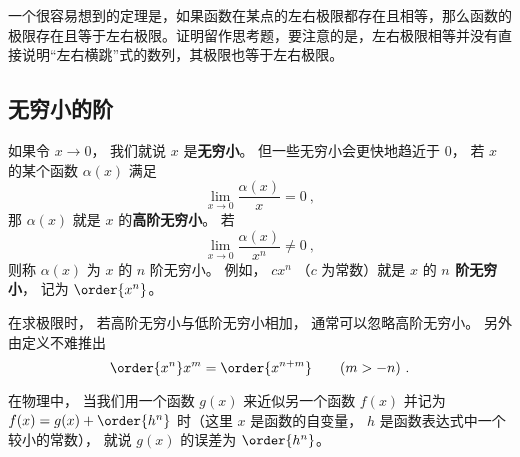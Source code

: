 一个很容易想到的定理是，如果函数在某点的左右极限都存在且相等，那么函数的极限存在且等于左右极限。证明留作思考题，要注意的是，左右极限相等并没有直接说明“左右横跳”式的数列，其极限也等于左右极限。





\subsection{无穷小的阶}\label{sub_Lim_1}
如果令 $x\to 0$， 我们就说 $x$ 是\textbf{无穷小}。 但一些无穷小会更快地趋近于 $0$， 若 $x$ 的某个函数 $\alpha(x)$ 满足
\begin{equation}
\lim_{x\to 0} \frac{\alpha(x)}{x} = 0~,
\end{equation}
那 $\alpha(x)$ 就是 $x$ 的\textbf{高阶无穷小}。 若
\begin{equation}
\lim_{x\to 0} \frac{\alpha(x)}{x^n} \ne 0~,
\end{equation}
则称 $\alpha(x)$ 为 $x$ 的 $n$ 阶无穷小。 例如， $c x^n$ （$c$ 为常数）就是 $x$ 的 \textbf{$n$ 阶无穷小}， 记为 $\order{x^n}$。

在求极限时， 若高阶无穷小与低阶无穷小相加， 通常可以忽略高阶无穷小。 另外由定义不难推出
\begin{equation}
\order{x^n} x^m = \order{x^{n + m}} \qquad (m > -n)~.
\end{equation}

在物理中， 当我们用一个函数 $g(x)$ 来近似另一个函数 $f(x)$ 并记为 $f(x) = g(x) + \order{h^n}$ 时（这里 $x$ 是函数的自变量， $h$ 是函数表达式中一个较小的常数）， 就说 $g(x)$ 的误差为 $\order{h^n}$。
